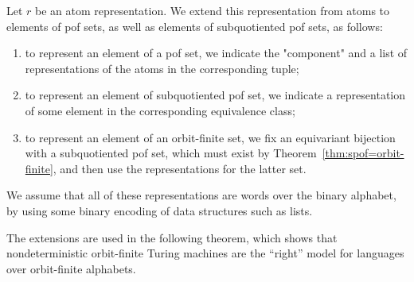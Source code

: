 \begin{definition}\label{def:atom-representation-extended-to-pof-sets}
	Let $r$ be an atom representation. We extend this representation from atoms to elements of pof sets, as well as elements of subquotiented pof sets, as follows: 
\begin{enumerate}
	\item\label{it:representation-for-pof-sets} to represent an element of a pof set, we indicate the "component" and a list of  representations of the atoms in the corresponding tuple;
	\item \label{it:representation-for-spof-sets} to represent an element of subquotiented pof set, we indicate  a representation of some element in the corresponding equivalence class;
	\item \label{it:representation-for-orbit-finite-sets} to represent an element of an orbit-finite set, we fix an equivariant bijection with a subquotiented pof set, which must exist by Theorem~\ref{thm:spof=orbit-finite}, and then use the representations for the latter set.
\end{enumerate}
We assume that all of these representations are words over the binary alphabet, by using some binary encoding of data structures such as lists.
\end{definition}



The extensions are used in the following theorem, which shows that nondeterministic orbit-finite Turing machines are the ``right'' model for languages over orbit-finite alphabets.



